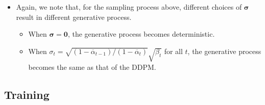 \documentclass[10pt]{article}
\newcommand{\ves}[1]{\boldsymbol{#1}}
\begin{document}
\begin{itemize}
  \item Again, we note that, for the sampling process above,  different choices of $\ves{\sigma}$ result in different generative process.
  \begin{itemize}
    \item When $\ves{\sigma} = \ves{0}$, the generative process becomes deterministic.
    
    \item When $\sigma_t = \sqrt{(1 - \overline{\alpha}_{t-1})/(1 - \overline{\alpha}_t)} \sqrt{\beta_t}$ for all $t$, the generative process becomes the same as that of the DDPM. 
  \end{itemize}
\end{itemize}

\subsection{Training}
\end{document}
